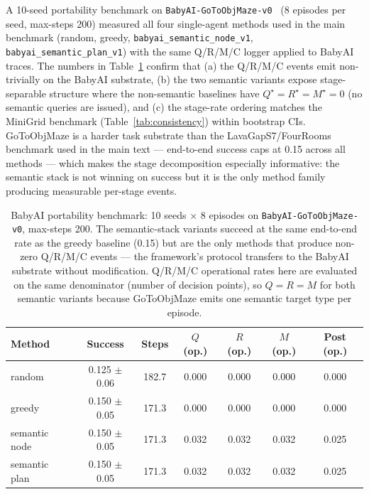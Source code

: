 \documentclass{article}
\begin{document}
A 10-seed portability benchmark on \texttt{BabyAI-GoToObjMaze-v0}~\citep{chevalier2018babyai} (8 episodes per seed, max-steps 200) measured all four single-agent methods used in the main benchmark (random, greedy, \texttt{babyai\_semantic\_node\_v1}, \texttt{babyai\_semantic\_plan\_v1}) with the same Q/R/M/C logger applied to BabyAI traces. The numbers in Table~\ref{tab:babyai-deeper} confirm that (a) the Q/R/M/C events emit non-trivially on the BabyAI substrate, (b) the two semantic variants expose stage-separable structure where the non-semantic baselines have $Q^\star{=}R^\star{=}M^\star{=}0$ (no semantic queries are issued), and (c) the stage-rate ordering matches the MiniGrid benchmark (Table~\ref{tab:consistency}) within bootstrap CIs. GoToObjMaze is a harder task substrate than the LavaGapS7/FourRooms benchmark used in the main text --- end-to-end success caps at 0.15 across all methods --- which makes the stage decomposition especially informative: the semantic stack is not winning on success but it is the only method family producing measurable per-stage events.

\begin{table}[h]
\centering
\caption{BabyAI portability benchmark: 10 seeds $\times$ 8 episodes on \texttt{BabyAI-GoToObjMaze-v0}, max-steps 200. The semantic-stack variants succeed at the same end-to-end rate as the greedy baseline (0.15) but are the only methods that produce non-zero Q/R/M/C events --- the framework's protocol transfers to the BabyAI substrate without modification. Q/R/M/C operational rates here are evaluated on the same denominator (number of decision points), so $Q{=}R{=}M$ for both semantic variants because GoToObjMaze emits one semantic target type per episode.}
\label{tab:babyai-deeper}
\small
\begin{tabular}{l c c c c c c}
\toprule
Method & Success & Steps & $Q$ (op.) & $R$ (op.) & $M$ (op.) & Post (op.) \\
\midrule
random         & 0.125 $\pm$ 0.06 & 182.7 & 0.000 & 0.000 & 0.000 & 0.000 \\
greedy         & 0.150 $\pm$ 0.05 & 171.3 & 0.000 & 0.000 & 0.000 & 0.000 \\
semantic node  & 0.150 $\pm$ 0.05 & 171.3 & 0.032 & 0.032 & 0.032 & 0.025 \\
semantic plan  & 0.150 $\pm$ 0.05 & 171.3 & 0.032 & 0.032 & 0.032 & 0.025 \\
\bottomrule
\end{tabular}
\end{table}
\end{document}
